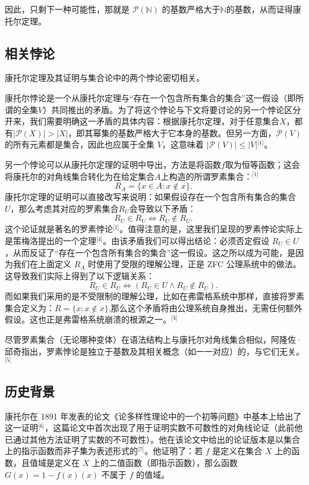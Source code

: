 因此，只剩下一种可能性，那就是 $\mathcal{P}(\mathbb{N})$ 的基数严格大于$\mathbb{N}$的基数，从而证得康托尔定理。
\subsection{相关悖论}
康托尔定理及其证明与集合论中的两个悖论密切相关。

康托尔悖论是一个从康托尔定理与“存在一个包含所有集合的集合”这一假设（即所谓的全集$V$）共同推出的矛盾。为了将这个悖论与下文将要讨论的另一个悖论区分开来，我们需要明确这一矛盾的具体内容：根据康托尔定理，对于任意集合$X$，都有$|\mathcal{P}(X)| > |X|$，即其幂集的基数严格大于它本身的基数。但另一方面，$\mathcal{P}(V)$ 的所有元素都是集合，因此也应属于全集 $V$，这意味着 $|\mathcal{P}(V)| \leq |V|$\(^\text{[1]}\)。

另一个悖论可以从康托尔定理的证明中导出，方法是将函数$f$取为恒等函数；这会将康托尔的对角线集合转化为在给定集合$A$上构造的所谓罗素集合：\(^\text{[1]}\)
$$
R_A = \{ x \in A : x \notin x \}.~
$$
康托尔定理的证明可以直接改写来说明：如果假设存在一个包含所有集合的集合 $U$，那么考虑其对应的罗素集合$R_U$会导致以下矛盾：
$$
R_U \in R_U \iff R_U \notin R_U.~
$$
这个论证就是著名的罗素悖论\(^\text{[1]}\)。值得注意的是，这里我们呈现的罗素悖论实际上是策梅洛提出的一个定理\(^\text{[4]}\)。由该矛盾我们可以得出结论：必须否定假设 $R_U \in U$，从而反证了“存在一个包含所有集合的集合”这一假设。这之所以成为可能，是因为我们在上面定义 $R_A$ 时使用了受限的理解公理，正是 ZFC 公理系统中的做法。这导致我们实际上得到了以下逻辑关系：
$$
R_U \in R_U \iff (R_U \in U \land R_U \notin R_U).~
$$
而如果我们采用的是不受限制的理解公理，比如在弗雷格系统中那样，直接将罗素集合定义为：$R = \{ x : x \notin x \}$,那么这个矛盾将由公理系统自身推出，无需任何额外假设。这也正是弗雷格系统崩溃的根源之一。\(^\text{[4]}\)

尽管罗素集合（无论哪种变体）在语法结构上与康托尔对角线集合相似，阿隆佐·邱奇指出，罗素悖论是独立于基数及其相关概念（如一一对应）的，与它们无关。\(^\text{[5]}\)
\subsection{历史背景}
康托尔在 1891 年发表的论文《论多样性理论中的一个初等问题》中基本上给出了这一证明\(^\text{[6]}\)，这篇论文中首次出现了用于证明实数不可数性的对角线论证（此前他已通过其他方法证明了实数的不可数性）。他在该论文中给出的论证版本是以集合上的指示函数而非子集为表述形式的\(^\text{[7]}\)。他证明了：若 $f$ 是定义在集合 $X$ 上的函数，且值域是定义在 $X$ 上的二值函数（即指示函数），那么函数 $G(x) = 1 - f(x)(x)$ 不属于 $f$ 的值域。

